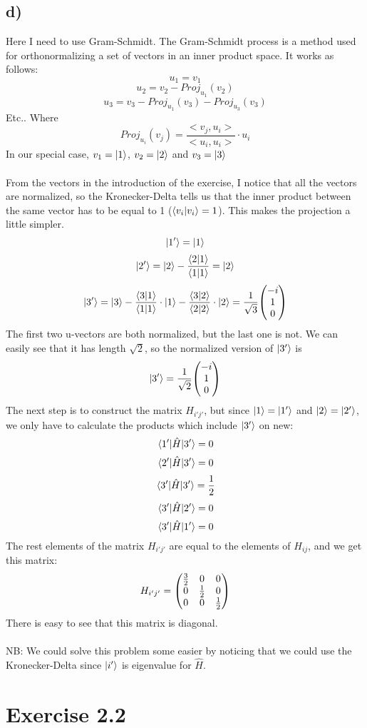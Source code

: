 \documentclass{scrartcl}
\begin{document}
\subsection{d)}
Here I need to use Gram-Schmidt. The Gram-Schmidt process is a method used for orthonormalizing a set of vectors in an inner product space. It works as follows:
$$u_1=v_1$$
$$u_2=v_2-Proj_{u_1}(v_2)$$
$$u_3=v_3-Proj_{u_1}(v_3)-Proj_{u_3}(v_3)$$
Etc..
Where
$$Proj_{u_i}(v_j)=\frac{<v_j, u_i>}{<u_i, u_i>}\cdot u_i$$
In our special case, $v_1=\ket{1}$, $v_2=\ket{2}$ and $v_3=\ket{3}$\\\\
From the vectors in the introduction of the exercise, I notice that all the vectors are normalized, so the Kronecker-Delta tells us that the inner product between the same vector has to be equal to 1 ($\braket{v_i}{v_i}=1$). This makes the projection a little simpler. 
$$\ket{1'}=\ket{1}$$
$$\ket{2'}=\ket{2}-\frac{\braket{2}{1}}{\braket{1}{1}}=\ket{2}$$
$$\ket{3'}=\ket{3}-\frac{\braket{3}{1}}{\braket{1}{1}}\cdot\ket{1}-\frac{\braket{3}{2}}{\braket{2}{2}}\cdot\ket{2}=\frac{1}{\sqrt{3}}\mqty(-i \\ 1 \\ 0)$$
The first two u-vectors are both normalized, but the last one is not. We can easily see that it has length $\sqrt{2}$, so the normalized version of $\ket{3'}$ is 
$$\ket{3'}=\frac{1}{\sqrt{2}}\mqty(-i \\ 1 \\ 0)$$
The next step is to construct the matrix $H_{i'j'}$, but since $\ket{1}=\ket{1'}$ and $\ket{2}=\ket{2'}$, we only have to calculate the products which include $\ket{3'}$ on new:
$$\mel*{1'}{\hat{H}}{3'}=0$$
$$\mel*{2'}{\hat{H}}{3'}=0$$
$$\mel*{3'}{\hat{H}}{3'}=\frac{1}{2}$$
$$\mel*{3'}{\hat{H}}{2'}=0$$
$$\mel*{3'}{\hat{H}}{1'}=0$$
The rest elements of the matrix $H_{i'j'}$ are equal to the elements of $H_{ij}$, and we get this matrix:
$$H_{i'j'}=\mqty(\frac{3}{2} & 0 & 0 \\ 0 & \frac{1}{2} & 0 \\ 0 & 0 & \frac{1}{2})$$
There is easy to see that this matrix is diagonal.\\\\
NB: We could solve this problem some easier by noticing that we could use the Kronecker-Delta since $\ket{i'}$ is eigenvalue for $\hat{H}$. 

\newpage
\section*{Exercise 2.2}
\end{document}
